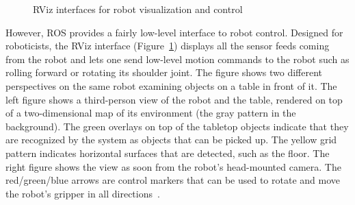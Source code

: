 \documentclass[10pt,twocolumn]{article}
\begin{document}
\begin{figure}[tbh]
\center{}
\caption{RViz interfaces for robot visualization and control}
\label{rviz}
\end{figure}

However, ROS provides a fairly low-level interface to robot control. Designed for roboticists, the RViz interface (Figure~\ref{rviz}) displays all the sensor feeds coming from the robot and lets one send low-level motion commands to the robot such as rolling forward or rotating its shoulder joint. The figure shows two different perspectives on the same robot examining objects on a table in front of it. The left figure shows a third-person view of the robot and the table, rendered on top of a two-dimensional map of its environment (the gray pattern in the background). The green overlays on top of the tabletop objects indicate that they are recognized by the system as objects that can be picked up. The yellow grid pattern indicates horizontal surfaces that are detected, such as the floor.  The right figure shows the view as soon from the robot's head-mounted camera. The red/green/blue arrows are control markers that can be used to rotate and move the robot's gripper in all directions~\cite{gossow-ieee11}.
\end{document}
